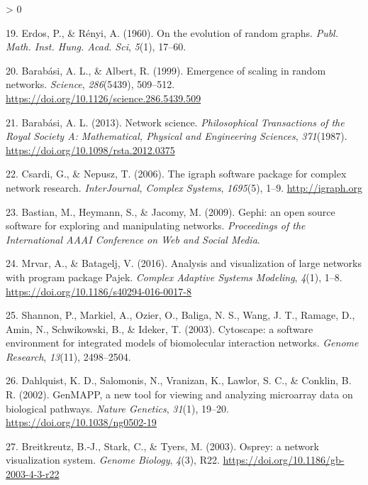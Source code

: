 \documentclass[
  12pt,
]{book}
\newlength{\cslhangindent}
\newenvironment{CSLReferences}[2] %
 {%
  \setlength{\parindent}{0pt}
  \ifodd #1 \everypar{\setlength{\hangindent}{\cslhangindent}}\ignorespaces\fi
  \ifnum #2 > 0
  \setlength{\parskip}{#2\baselineskip}
  \fi
 }%
 {}
\begin{document}
\begin{CSLReferences}{1}{0}
\leavevmode\hypertarget{ref-Erdos1960}{}%
19. Erdos, P., \& Rényi, A. (1960). {On the evolution of random graphs}. \emph{Publ. Math. Inst. Hung. Acad. Sci}, \emph{5}(1), 17--60.

\leavevmode\hypertarget{ref-Barabasi1999}{}%
20. Barabási, A. L., \& Albert, R. (1999). {Emergence of scaling in random networks}. \emph{Science}, \emph{286}(5439), 509--512. \url{https://doi.org/10.1126/science.286.5439.509}

\leavevmode\hypertarget{ref-Barabasi2013}{}%
21. Barabási, A. L. (2013). {Network science}. \emph{Philosophical Transactions of the Royal Society A: Mathematical, Physical and Engineering Sciences}, \emph{371}(1987). \url{https://doi.org/10.1098/rsta.2012.0375}

\leavevmode\hypertarget{ref-Csardi2006}{}%
22. Csardi, G., \& Nepusz, T. (2006). {The igraph software package for complex network research}. \emph{InterJournal, Complex Systems}, \emph{1695}(5), 1--9. \url{http://igraph.org}

\leavevmode\hypertarget{ref-Bastian2009}{}%
23. Bastian, M., Heymann, S., \& Jacomy, M. (2009). {Gephi: an open source software for exploring and manipulating networks}. \emph{Proceedings of the International AAAI Conference on Web and Social Media}.

\leavevmode\hypertarget{ref-Mrvar2016}{}%
24. Mrvar, A., \& Batagelj, V. (2016). {Analysis and visualization of large networks with program package Pajek}. \emph{Complex Adaptive Systems Modeling}, \emph{4}(1), 1--8. \url{https://doi.org/10.1186/s40294-016-0017-8}

\leavevmode\hypertarget{ref-Shannon2003}{}%
25. Shannon, P., Markiel, A., Ozier, O., Baliga, N. S., Wang, J. T., Ramage, D., Amin, N., Schwikowski, B., \& Ideker, T. (2003). {Cytoscape: a software environment for integrated models of biomolecular interaction networks}. \emph{Genome Research}, \emph{13}(11), 2498--2504.

\leavevmode\hypertarget{ref-Dahlquist2002}{}%
26. Dahlquist, K. D., Salomonis, N., Vranizan, K., Lawlor, S. C., \& Conklin, B. R. (2002). {GenMAPP, a new tool for viewing and analyzing microarray data on biological pathways}. \emph{Nature Genetics}, \emph{31}(1), 19--20. \url{https://doi.org/10.1038/ng0502-19}

\leavevmode\hypertarget{ref-Breitkreutz2003}{}%
27. Breitkreutz, B.-J., Stark, C., \& Tyers, M. (2003). {Osprey: a network visualization system}. \emph{Genome Biology}, \emph{4}(3), R22. \url{https://doi.org/10.1186/gb-2003-4-3-r22}


\end{CSLReferences}
\end{document}
